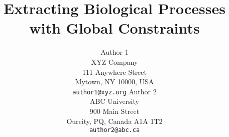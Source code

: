 \documentclass[11pt,letterpaper]{article}
\title{Extracting Biological Processes with Global Constraints}
\author{Author 1\\
	    XYZ Company\\
	    111 Anywhere Street\\
	    Mytown, NY 10000, USA\\
	    {\tt author1@xyz.org}
	  \And
	Author 2\\
  	ABC University\\
  	900 Main Street\\
  	Ourcity, PQ, Canada A1A 1T2\\
  {\tt author2@abc.ca}}
\begin{document}
\maketitle

 
 \label{sec:intro}
 \label{sec:related}
 \label{sec:process}
 \label{sec:model}
 \label{sec:experiment}
 \label{sec:conclusion}




\end{document}
